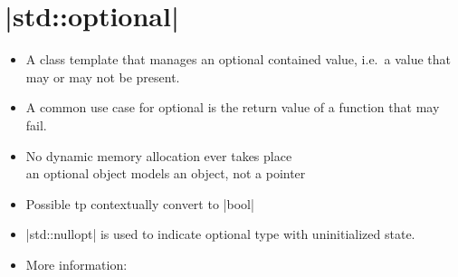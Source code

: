 \section{\CPP|std::optional|}
\begin{frame}[fragile]{\insertsectionhead}
    \vspace{-3mm}
    \begin{itemize}
        \item A class template that manages an optional contained value, i.e.\ a value that may or may not be present.
        \item A common use case for optional is the return value of a function that may fail.
        \item No dynamic memory allocation ever takes place\\
              \then \alert{an optional object models an object, not a pointer}
        \item Possible tp contextually convert to \CPP|bool|
        \item \CPP|std::nullopt| is used to indicate optional type with uninitialized state.
        \item More information: 
    \end{itemize}
\end{frame}
